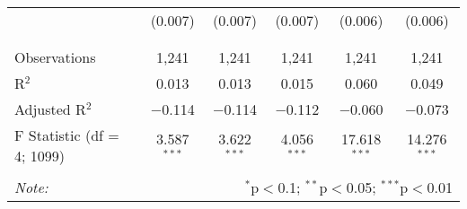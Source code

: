 \begin{table}[!htbp]
\begin{tabular}{@{\extracolsep{5pt}}lccccc}
  & (0.007) & (0.007) & (0.007) & (0.006) & (0.006) \\ 
  & & & & & \\ 
\hline \\[-1.8ex] 
Observations & 1,241 & 1,241 & 1,241 & 1,241 & 1,241 \\ 
R$^{2}$ & 0.013 & 0.013 & 0.015 & 0.060 & 0.049 \\ 
Adjusted R$^{2}$ & $-$0.114 & $-$0.114 & $-$0.112 & $-$0.060 & $-$0.073 \\ 
F Statistic (df = 4; 1099) & 3.587$^{***}$ & 3.622$^{***}$ & 4.056$^{***}$ & 17.618$^{***}$ & 14.276$^{***}$ \\ 
\hline 
\hline \\[-1.8ex] 
\textit{Note:}  & \multicolumn{5}{r}{$^{*}$p$<$0.1; $^{**}$p$<$0.05; $^{***}$p$<$0.01} \\ 
\end{tabular} 
\end{table} 
